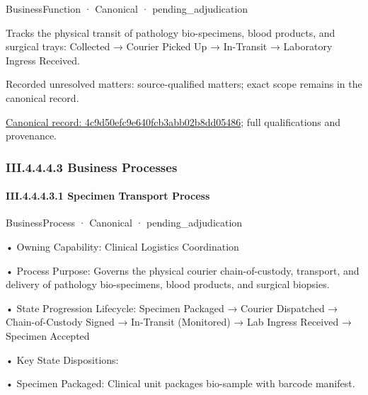 \label{element:4c9d50efc9e640fcb3abb02b8dd05486}
{\small BusinessFunction · Canonical · pending\_adjudication}\par

Tracks the physical transit of pathology bio-specimens, blood products, and surgical trays: Collected → Courier Picked Up → In-Transit → Laboratory Ingress Received.


{\small Recorded unresolved matters: source-qualified matters; exact scope remains in the canonical record.}\par
{\footnotesize \href{../../../../continuum/business/business-function/4c9d50efc9e640fcb3abb02b8dd05486.md}{Canonical record: 4c9d50efc9e640fcb3abb02b8dd05486}; full qualifications and provenance.}\par
\subsubsection*{III.4.4.4.3 Business Processes}
\label{navigation:III.4.4.4.3}

\paragraph*{III.4.4.4.3.1 Specimen Transport Process}
\label{navigation:III.4.4.4.3.1}

\label{element:11bb000294fc44a8af295f4682e2fe6c}
{\small BusinessProcess · Canonical · pending\_adjudication}\par

•
Owning Capability: Clinical Logistics Coordination



•
Process Purpose: Governs the physical courier chain-of-custody, transport, and delivery of pathology bio-specimens, blood products, and surgical biopsies.



•
State Progression Lifecycle: Specimen Packaged → Courier Dispatched → Chain-of-Custody Signed → In-Transit (Monitored) → Lab Ingress Received → Specimen Accepted



•
Key State Dispositions:



•
Specimen Packaged: Clinical unit packages bio-sample with barcode manifest.




